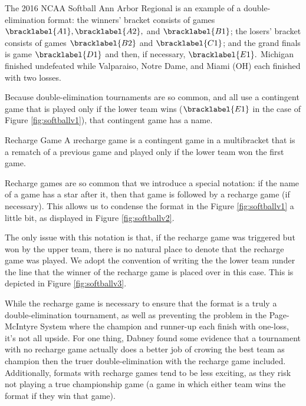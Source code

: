 {    The 2016 NCAA Softball Ann Arbor Regional is an example of a double-elimination format: the winners' bracket consists of games $\bracklabel{A1}, \bracklabel{A2},$ and $\bracklabel{B1}$; the losers' bracket consists of games $\bracklabel{B2}$ and $\bracklabel{C1}$; and the grand finals is game $\bracklabel{D1}$ and then, if necessary, $\bracklabel{E1}.$ Michigan finished undefeated while Valparaiso, Notre Dame, and Miami (OH) each finished with two losses.

    Because double-elimination tournaments are so common, and all use a contingent game that is played only if the lower team wins ($\bracklabel{E1}$ in the case of Figure \ref{fig:softballv1}), that contingent game has a name.

    \begin{definition}{Recharge Game}{}
        A \i{recharge game} is a contingent game in a multibracket that is a rematch of a previous game and played only if the lower team won the first game.
    \end{definition}

    Recharge games are so common that we introduce a special notation: if the name of a game has a star after it, then that game is followed by a recharge game (if necessary). This allows us to condense the format in the Figure \ref{fig:softballv1} a little bit, as displayed in Figure \ref{fig:softballv2}.


    The only issue with this notation is that, if the recharge game was triggered but won by the upper team, there is no natural place to denote that the recharge game was played. We adopt the convention of writing the the lower team \i{under} the line that the winner of the recharge game is placed over in this case. This is depicted in Figure \ref{fig:softballv3}.
    

    While the recharge game is necessary to ensure that the format is a truly a double-elimination tournament, as well as preventing the problem in the Page-McIntyre System where the champion and runner-up each finish with one-loss, it's not all upside. For one thing, Dabney \cite{recharge_rounds} found some evidence that a tournament with no recharge game actually does a better job of crowing the best team as champion then the truer double-elimination with the recharge game included. Additionally, formats with recharge games tend to be less exciting, as they risk not playing a true championship game (a game in which either team wins the format if they win that game).

}
